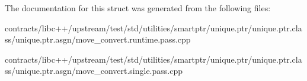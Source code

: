 The documentation for this struct was generated from the following files\+:\begin{DoxyCompactItemize}
\item 
contracts/libc++/upstream/test/std/utilities/smartptr/unique.\+ptr/unique.\+ptr.\+class/unique.\+ptr.\+asgn/move\+\_\+convert.\+runtime.\+pass.\+cpp\item 
contracts/libc++/upstream/test/std/utilities/smartptr/unique.\+ptr/unique.\+ptr.\+class/unique.\+ptr.\+asgn/move\+\_\+convert.\+single.\+pass.\+cpp\end{DoxyCompactItemize}
